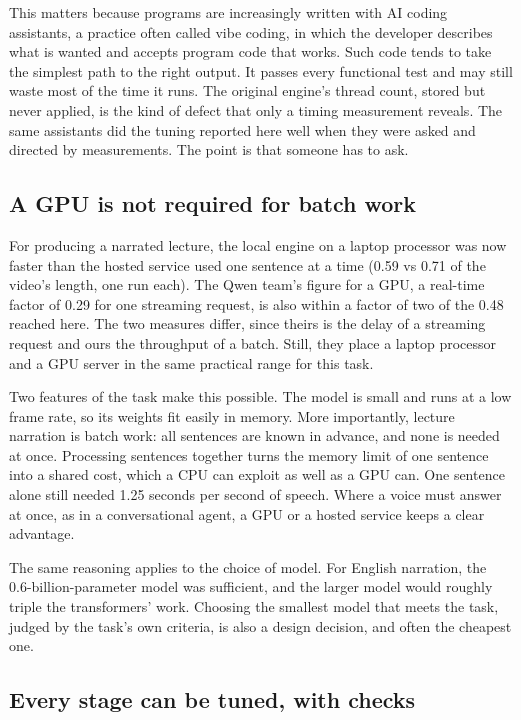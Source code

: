 \documentclass[11pt]{article}
\begin{document}
This matters because programs are increasingly written with AI coding
assistants, a practice often called vibe coding, in which the developer
describes what is wanted and accepts program code that works. Such code
tends to take the simplest path to the right output. It passes every
functional test and may still waste most of the time it runs. The
original engine's thread count, stored but never applied, is the kind of
defect that only a timing measurement reveals. The same assistants did
the tuning reported here well when they were asked and directed by
measurements. The point is that someone has to ask.

\hypertarget{a-gpu-is-not-required-for-batch-work}{%
\subsection{A GPU is not required for batch
work}\label{a-gpu-is-not-required-for-batch-work}}

For producing a narrated lecture, the local engine on a laptop processor
was now faster than the hosted service used one sentence at a time (0.59
vs 0.71 of the video's length, one run each). The Qwen team's figure for
a GPU, a real-time factor of 0.29 for one streaming request, is also
within a factor of two of the 0.48 reached here. The two measures
differ, since theirs is the delay of a streaming request and ours the
throughput of a batch. Still, they place a laptop processor and a GPU
server in the same practical range for this task.

Two features of the task make this possible. The model is small and runs
at a low frame rate, so its weights fit easily in memory. More
importantly, lecture narration is batch work: all sentences are known in
advance, and none is needed at once. Processing sentences together turns
the memory limit of one sentence into a shared cost, which a CPU can
exploit as well as a GPU can. One sentence alone still needed 1.25
seconds per second of speech. Where a voice must answer at once, as in a
conversational agent, a GPU or a hosted service keeps a clear advantage.

The same reasoning applies to the choice of model. For English
narration, the 0.6-billion-parameter model was sufficient, and the
larger model would roughly triple the transformers' work. Choosing the
smallest model that meets the task, judged by the task's own criteria,
is also a design decision, and often the cheapest one.

\hypertarget{every-stage-can-be-tuned-with-checks}{%
\subsection{Every stage can be tuned, with
checks}\label{every-stage-can-be-tuned-with-checks}}
\end{document}
